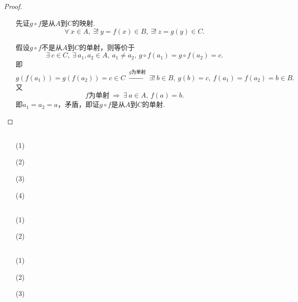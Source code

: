 \documentclass[UTF8]{ctexart}
\begin{document}
\subsection{}   %
\begin{proof}
    
    \begin{enumerate}
        \item []
        \item []先证$g\circ f$是从$A$到$C$的映射.
        \[
            \forall\ x\in A,\ \exists !\ y=f(x)\in B,\ \exists !\ z=g(y)\in C.
        \]
        \item []假设$g\circ f$不是从$A$到$C$的单射，则等价于
        \[
            \exists\ c\in C,\ \exists\ a_1,a_2\in A,\ a_1\neq a_2,\
            g\circ f(a_1)=g\circ f(a_2)=c.
        \]
        即
        \[
            g(f(a_1))=g(f(a_2))=c\in C
            \ \xrightarrow{g为单射}\ 
            \exists !\ b\in B,\ g(b)=c,\ 
            f(a_1)=f(a_2)=b\in B.    
        \]
        又
        \[
            f\mbox{为单射}
            \ \Rightarrow\ 
            \exists\ a\in A,\ f(a)=b.    
        \]
        即$a_1 = a_2 = a$，矛盾，即证$g\circ f$是从$A$到$C$的单射.
    \end{enumerate}
\end{proof}

\subsection{}   %


\subsection{}   %
\begin{enumerate}
    \item [(1)]
    \item [(2)]
    \item [(3)]
    \item [(4)]
\end{enumerate}

\subsection{}   %
\begin{enumerate}
    \item [(1)]
    \item [(2)]
\end{enumerate}

\subsection{}   %
\begin{enumerate}
    \item [(1)]
    \item [(2)]
    \item [(3)]
\end{enumerate}
\end{document}
